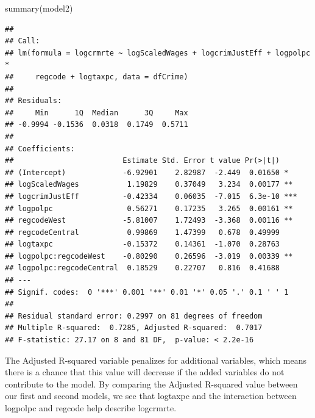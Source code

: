 \documentclass[]{article}
\newenvironment{Shaded}{}{}
\newcommand{\CommentTok}[1]{\textcolor[rgb]{0.00,0.50,0.00}{#1}}
\newcommand{\KeywordTok}[1]{\textcolor[rgb]{0.00,0.00,1.00}{#1}}
\newcommand{\NormalTok}[1]{#1}
\begin{document}
\begin{Shaded}
\end{Shaded}

\begin{Shaded}
\begin{Highlighting}[]
\KeywordTok{summary}\NormalTok{(model2)}
\end{Highlighting}
\end{Shaded}

\begin{verbatim}
## 
## Call:
## lm(formula = logcrmrte ~ logScaledWages + logcrimJustEff + logpolpc * 
##     regcode + logtaxpc, data = dfCrime)
## 
## Residuals:
##     Min      1Q  Median      3Q     Max 
## -0.9994 -0.1536  0.0318  0.1749  0.5711 
## 
## Coefficients:
##                         Estimate Std. Error t value Pr(>|t|)    
## (Intercept)             -6.92901    2.82987  -2.449  0.01650 *  
## logScaledWages           1.19829    0.37049   3.234  0.00177 ** 
## logcrimJustEff          -0.42334    0.06035  -7.015  6.3e-10 ***
## logpolpc                 0.56271    0.17235   3.265  0.00161 ** 
## regcodeWest             -5.81007    1.72493  -3.368  0.00116 ** 
## regcodeCentral           0.99869    1.47399   0.678  0.49999    
## logtaxpc                -0.15372    0.14361  -1.070  0.28763    
## logpolpc:regcodeWest    -0.80290    0.26596  -3.019  0.00339 ** 
## logpolpc:regcodeCentral  0.18529    0.22707   0.816  0.41688    
## ---
## Signif. codes:  0 '***' 0.001 '**' 0.01 '*' 0.05 '.' 0.1 ' ' 1
## 
## Residual standard error: 0.2997 on 81 degrees of freedom
## Multiple R-squared:  0.7285, Adjusted R-squared:  0.7017 
## F-statistic: 27.17 on 8 and 81 DF,  p-value: < 2.2e-16
\end{verbatim}

The Adjusted R-squared variable penalizes for additional variables,
which means there is a chance that this value will decrease if the added
variables do not contribute to the model. By comparing the Adjusted
R-squared value between our first and second models, we see that
logtaxpc and the interaction between logpolpc and regcode help describe
logcrmrte.
\end{document}
